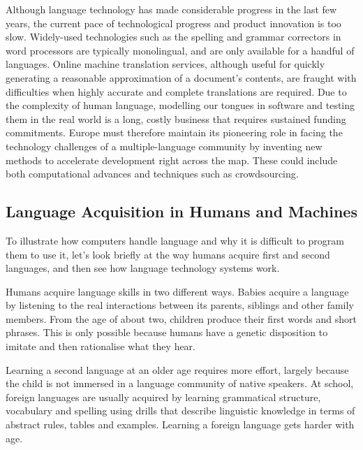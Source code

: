 \begin{multicols}{2}
\begin{itemize}
\begin{multicols}{2}
    Although language technology has made considerable progress in the last few years, the current pace of technological progress and product innovation is too slow. 
Widely-used technologies such as the spelling and grammar correctors in word processors are typically monolingual, and are only available for a handful of languages. Online machine translation services, although useful for quickly generating a reasonable approximation of a document’s contents, are fraught with difficulties when highly accurate and complete translations are required. Due to the complexity of human language, modelling our tongues in software and testing them in the real world is a long, costly business that requires sustained funding commitments. Europe must therefore maintain its pioneering role in facing the technology challenges of a multiple-language community by inventing new methods to accelerate development right across the map. These could include both computational advances and techniques such as crowdsourcing.


\subsection{Language Acquisition in Humans and Machines}

    To illustrate how computers handle language and why it is difficult to program them to use it, let’s look briefly at the way humans acquire first and second languages, and then see how language technology systems work. 

    Humans acquire language skills in two different ways. Babies acquire a language by listening to the real interactions between its parents, siblings and other family members. From the age of about two, children produce their first words and short phrases. This is only possible because humans have a genetic disposition to imitate and then rationalise what they hear. 

    Learning a second language at an older age requires more effort, largely because the child is not immersed in a language community of native speakers. At school, foreign languages are usually acquired by learning grammatical structure, vocabulary and spelling using drills that describe linguistic knowledge in terms of abstract rules, tables and examples. Learning a foreign language gets harder with age.


\end{multicols}
\end{itemize}
\end{multicols}
